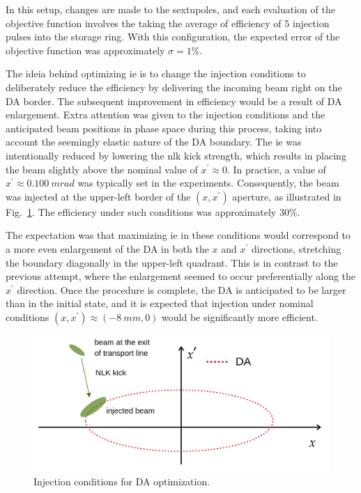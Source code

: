 In this setup, changes are made to the sextupoles, and each evaluation of the objective function involves the taking the average of efficiency of 5 injection pulses into the storage ring. With this configuration, the expected error of the objective function was approximately $\sigma=1\%$.

The ideia behind optimizing \gls*{ie} is to change the injection conditions to deliberately reduce the efficiency by delivering the incoming beam right on the \gls*{DA} border. The subsequent improvement in efficiency would be a result of \gls*{DA} enlargement. Extra attention was given to the injection conditions and the anticipated beam positions in phase space during this process, taking into account the seemingly elastic nature of the \gls*{DA} boundary. The \gls*{ie} was intentionally reduced by lowering the \gls*{nlk} kick strength, which results in placing the beam slightly above the nominal value of $x^\prime\approx 0$. In practice, a value of $x^\prime\approx 0.100~\unit{mrad}$ was typically set in the experiments. Consequently, the beam was injected at the upper-left border of the $(x,x^\prime)$ aperture, as illustrated in Fig.~\ref{fig:inj_cond}. The efficiency under such conditions was approximately $30\%$.

The expectation was that maximizing \gls*{ie} in these conditions would correspond to a more even enlargement of the \gls*{DA} in both the $x$ and $x^{\prime}$ directions, stretching the boundary diagonally in the upper-left quadrant. This is in contrast to the previous attempt, where the enlargement seemed to occur preferentially along the $x^\prime$ direction. Once the procedure is complete, the \gls*{DA} is anticipated to be larger than in the initial state, and it is expected that injection under nominal conditions $(x, x^\prime)\approx(-8~\unit{mm}, 0)$ would be significantly more efficient.
\begin{figure}[tb]
    \centering
    \includegraphics[width=0.7\columnwidth]{Images/inj_cond.png}
    \caption[Injection conditions for DA optimization.]{Injection conditions for \gls*{DA} optimization.}
    \label{fig:inj_cond}
\end{figure}

